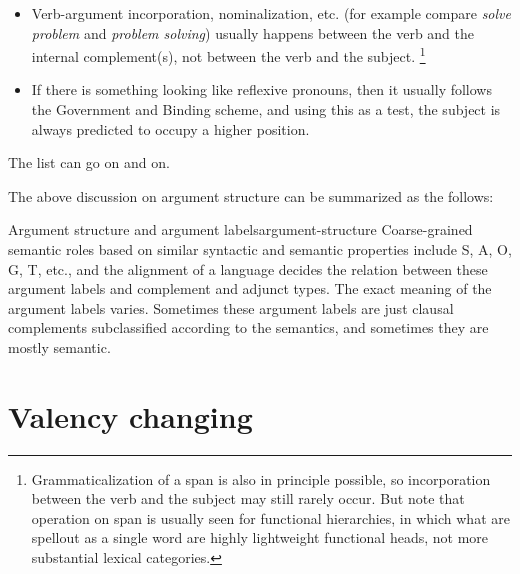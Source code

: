 \documentclass[UTF8, a4paper, oneside, scheme=plain]{ctexart}
\newcommand*{\citechap}[1]{chap.~{#1}}
\newcommand*{\corpus}[1]{\emph{#1}}
\begin{document}
\begin{itemize}
    Some notes about \ac{blt} \citechap{13}, Appendix 1: 
    TODO: S argument and A argument are by default bounded by $\forall$,
    while O is bounded by $\exists$ -- is this cross-linguistically correct?
    This also explains why verb-object incorporation is frequent:
    \corpus{a cat kills some animals} = \corpus{a cat kills}.
    It seems the only argument -- be it peripheral or core -- 
    that is by default bounded by $\forall$ is S in intransitive clauses and A in transitive clauses
    (which may be seen as a double check ).
    What's the counterpart in syntactic ergative languages?
    \item Verb-argument incorporation, nominalization, etc. 
    (for example compare \corpus{solve problem} and \corpus{problem solving}) 
    usually happens between the verb and the internal complement(s),
    not between the verb and the subject.%
    \footnote{
        Grammaticalization of a span is also in principle possible,
        so incorporation between the verb and the subject 
        may still rarely occur.
        But note that operation on span is usually seen for functional hierarchies,
        in which what are spellout as a single word 
        are highly lightweight functional heads, 
        not more substantial lexical categories.
    }
    \item If there is something looking like reflexive pronouns, 
    then it usually follows the Government and Binding scheme,
    and using this as a test,
    the subject is always predicted to occupy a higher position.
\end{itemize}
The list can go on and on.

The above discussion on argument structure can be summarized as the follows:
\begin{infobox}{Argument structure and argument labels}{argument-structure}
    Coarse-grained semantic roles based on similar syntactic and semantic properties 
    include S, A, O, G, T, etc.,
    and the alignment of a language decides 
    the relation between these argument labels
    and complement and adjunct types.
    The exact meaning of the argument labels varies.
    Sometimes these argument labels are just clausal complements subclassified 
    according to the semantics,
    and sometimes they are mostly semantic.
\end{infobox}

\section{Valency changing}
\end{document}
